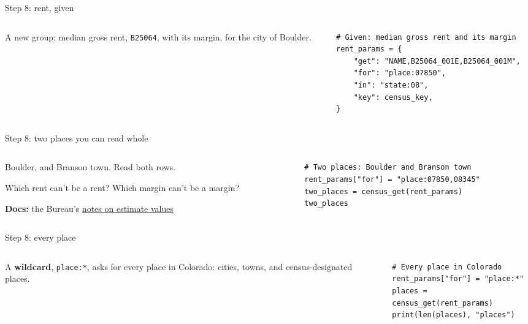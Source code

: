 \documentclass[9pt,aspectratio=169]{beamer}
\begin{document}
\begin{frame}[fragile]{Step 8: rent, given}
    \begin{columns}[T]
        \begin{column}{0.37\textwidth}
            A new group: median gross rent, \texttt{B25064}, with its margin, for the city of Boulder.
        \end{column}
        \begin{column}{0.6\textwidth}
\begin{lstlisting}
# Given: median gross rent and its margin
rent_params = {
    "get": "NAME,B25064_001E,B25064_001M",
    "for": "place:07850",
    "in": "state:08",
    "key": census_key,
}
\end{lstlisting}
        \end{column}
    \end{columns}
\end{frame}

\begin{frame}[fragile]{Step 8: two places you can read whole}
    \begin{columns}[T]
        \begin{column}{0.37\textwidth}
            Boulder, and Branson town. Read both rows.

            \medskip
            Which rent can't be a rent? Which margin can't be a margin?

            \medskip
            {\scriptsize\textbf{Docs:} the Bureau's \href{https://www.census.gov/data/developers/data-sets/acs-1year/notes-on-acs-estimate-and-annotation-values.html}{notes on estimate values}\par}
        \end{column}
        \begin{column}{0.6\textwidth}
\begin{lstlisting}
# Two places: Boulder and Branson town
rent_params["for"] = "place:07850,08345"
two_places = census_get(rent_params)
two_places
\end{lstlisting}
        \end{column}
    \end{columns}
\end{frame}

\begin{frame}[fragile]{Step 8: every place}
    \begin{columns}[T]
        \begin{column}{0.37\textwidth}
            A \textbf{wildcard}, \texttt{place:*}, asks for every place in Colorado: cities, towns, and census-designated places.
        \end{column}
        \begin{column}{0.6\textwidth}
\begin{lstlisting}
# Every place in Colorado
rent_params["for"] = "place:*"
places = census_get(rent_params)
print(len(places), "places")
\end{lstlisting}
        \end{column}
    \end{columns}
\end{frame}
\end{document}

